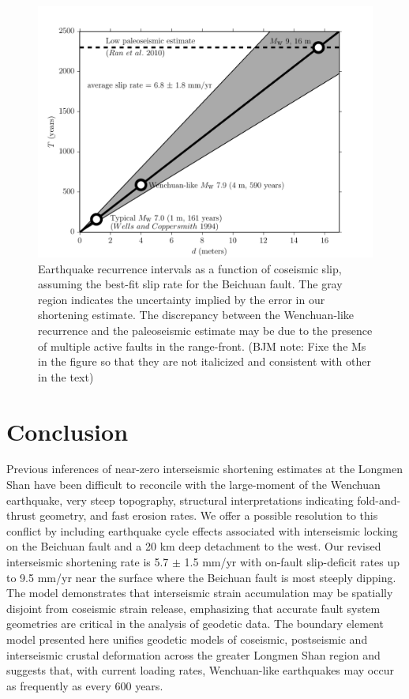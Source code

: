 \documentclass[12pt]{article}
\begin{document}
\begin{figure}[h!]
    \centering
    \includegraphics{figs/hazard_all_details.pdf}
    \caption{Earthquake recurrence intervals as a function of coseismic slip, assuming the best-fit slip rate for the Beichuan fault. The gray region indicates the uncertainty implied by the error in our shortening estimate. The discrepancy between the Wenchuan-like recurrence and the paleoseismic estimate may be due to the presence of multiple active faults in the range-front. (BJM note: Fixe the Ms in the figure so that they are not italicized and consistent with other in the text)}
    \label{fig:hazard}
\end{figure}

\section{Conclusion}
Previous inferences of near-zero interseismic shortening estimates at the Longmen Shan have been difficult to reconcile with the large-moment of the Wenchuan earthquake, very steep topography, structural interpretations indicating fold-and-thrust geometry, and fast erosion rates. We offer a possible resolution to this conflict by including earthquake cycle effects associated with interseismic locking on the Beichuan fault and a 20 km deep detachment to the west. Our revised interseismic shortening rate is 5.7 $\pm$ 1.5 mm/yr with on-fault slip-deficit rates up to 9.5 mm/yr near the surface where the Beichuan fault is most steeply dipping. The model demonstrates that interseismic strain accumulation may be spatially disjoint from coseismic strain release, emphasizing that accurate fault system geometries are critical in the analysis of geodetic data. The boundary element model presented here unifies geodetic models of coseismic, postseismic and interseismic crustal deformation across the greater Longmen Shan region and suggests that, with current loading rates, Wenchuan-like earthquakes may occur as frequently as every 600 years.



\end{document}
